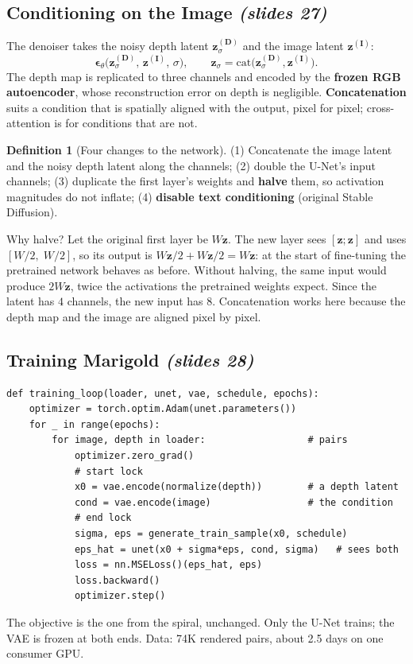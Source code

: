 \documentclass[11pt,a4paper]{article}
\newcommand{\bz}{\bm{z}}
\newcommand{\beps}{\bm{\epsilon}}
\newcommand{\slides}[1]{\texorpdfstring{\emph{(slides #1)}}{(slides #1)}}
\theoremstyle{plain}
\theoremstyle{definition}
\newtheorem{definition}[theorem]{Definition}
\numberwithin{equation}{section}
\begin{document}
\subsection{Conditioning on the Image \slides{27}}
The denoiser takes the noisy depth latent $\bz^{(\bm D)}_\sigma$ and the image latent $\bz^{(\bm I)}$:
\begin{equation}
\beps_\theta\bigl(\bz^{(\bm D)}_\sigma,\,\bz^{(\bm I)},\,\sigma\bigr),\qquad \bz_\sigma=\mathrm{cat}\bigl(\bz^{(\bm D)}_\sigma,\bz^{(\bm I)}\bigr).
\end{equation}
The depth map is replicated to three channels and encoded by the \textbf{frozen RGB autoencoder}, whose reconstruction error on depth is negligible. \textbf{Concatenation} suits a condition that is spatially aligned with the output, pixel for pixel; cross-attention is for conditions that are not.

\begin{definition}[Four changes to the network]
(1) Concatenate the image latent and the noisy depth latent along the channels; (2) double the U-Net's input channels; (3) duplicate the first layer's weights and \textbf{halve} them, so activation magnitudes do not inflate; (4) \textbf{disable text conditioning} (original Stable Diffusion).
\end{definition}

\begin{intuition}
Why halve? Let the original first layer be $W\bz$. The new layer sees $[\bz;\bz]$ and uses $[W/2,\;W/2]$, so its output is $W\bz/2+W\bz/2=W\bz$: at the start of fine-tuning the pretrained network behaves as before. Without halving, the same input would produce $2W\bz$, twice the activations the pretrained weights expect. Since the latent has $4$ channels, the new input has $8$. Concatenation works here because the depth map and the image are aligned pixel by pixel.
\end{intuition}

\subsection{Training Marigold \slides{28}}
\begin{lstlisting}
def training_loop(loader, unet, vae, schedule, epochs):
    optimizer = torch.optim.Adam(unet.parameters())
    for _ in range(epochs):
        for image, depth in loader:                  # pairs
            optimizer.zero_grad()
            # start lock
            x0 = vae.encode(normalize(depth))        # a depth latent
            cond = vae.encode(image)                 # the condition
            # end lock
            sigma, eps = generate_train_sample(x0, schedule)
            eps_hat = unet(x0 + sigma*eps, cond, sigma)   # sees both
            loss = nn.MSELoss()(eps_hat, eps)
            loss.backward()
            optimizer.step()
\end{lstlisting}
The objective is the one from the spiral, unchanged. Only the U-Net trains; the VAE is frozen at both ends. Data: 74K rendered pairs, about 2.5 days on one consumer GPU.
\end{document}
